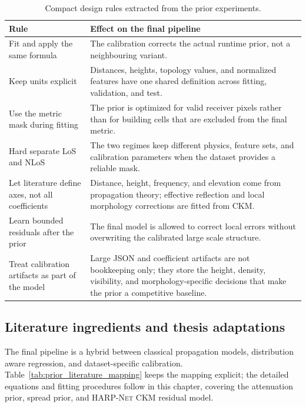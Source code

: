 \begin{table}[H]
\centering
\caption{Compact design rules extracted from the prior experiments.}
\label{tab:prior_design_rules}
\small
\begin{tabularx}{\textwidth}{>{\raggedright\arraybackslash}p{}
>{\raggedright\arraybackslash}X}
\toprule
Rule & Effect on the final pipeline \\
\midrule
Fit and apply the same formula &
The calibration corrects the actual runtime prior, not a neighbouring variant. \\
Keep units explicit &
Distances, heights, topology values, and normalized features have one shared
definition across fitting, validation, and test. \\
Use the metric mask during fitting &
The prior is optimized for valid receiver pixels rather than for building cells
that are excluded from the final metric. \\
Hard separate LoS and NLoS &
The two regimes keep different physics, feature sets, and calibration
parameters when the dataset provides a reliable mask. \\
Let literature define axes, not all coefficients &
Distance, height, frequency, and elevation come from propagation theory;
effective reflection and local morphology corrections are fitted from CKM. \\
Learn bounded residuals after the prior &
The final model is allowed to correct local errors without overwriting the calibrated
large scale structure. \\
Treat calibration artifacts as part of the model &
Large JSON and coefficient artifacts are not bookkeeping only; they store the
height, density, visibility, and morphology-specific decisions that make the
prior a competitive baseline. \\
\bottomrule
\end{tabularx}
\end{table}

\subsection{Literature ingredients and thesis adaptations}

The final pipeline is a hybrid between classical propagation models,
distribution aware regression, and dataset-specific calibration.
Table~\ref{tab:prior_literature_mapping} keeps the mapping explicit; the
detailed equations and fitting procedures follow in this chapter, covering the
attenuation prior, spread prior, and \textsc{HARP-Net CKM} residual model.


